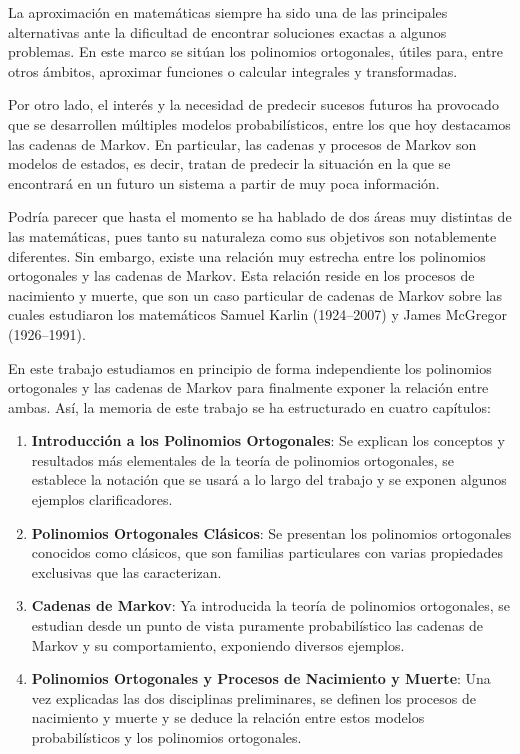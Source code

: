 
La aproximación en matemáticas siempre ha sido una de las principales alternativas ante la dificultad de encontrar soluciones exactas a algunos problemas. En este marco se sitúan los polinomios ortogonales, útiles para, entre otros ámbitos, aproximar funciones o calcular integrales y transformadas. 

Por otro lado, el interés y la necesidad de predecir sucesos futuros ha provocado que se desarrollen múltiples modelos probabilísticos, entre los que hoy destacamos las cadenas de Markov. En particular, las cadenas y procesos de Markov son modelos de estados, es decir, tratan de predecir la situación en la que se encontrará en un futuro un sistema a partir de muy poca información. 

Podría parecer que hasta el momento se ha hablado de dos áreas muy distintas de las matemáticas, pues tanto su naturaleza como sus objetivos son notablemente diferentes. Sin embargo, existe una relación muy estrecha entre los polinomios ortogonales y las cadenas de Markov. Esta relación reside en los procesos de nacimiento y muerte, que son un caso particular de cadenas de Markov sobre las cuales estudiaron los matemáticos Samuel Karlin (1924--2007) y James McGregor (1926--1991).

En este trabajo estudiamos en principio de forma independiente los polinomios ortogonales y las cadenas de Markov para finalmente exponer la relación entre ambas. Así, la memoria de este trabajo se ha estructurado en cuatro capítulos:

\begin{enumerate}
    \item \textbf{Introducción a los Polinomios Ortogonales}: Se explican los conceptos y resultados más elementales de la teoría de polinomios ortogonales, se establece la notación que se usará a lo largo del trabajo y se exponen algunos ejemplos clarificadores.
    \item \textbf{Polinomios Ortogonales Clásicos}: Se presentan los polinomios ortogonales conocidos como clásicos, que son familias particulares con varias propiedades exclusivas que las caracterizan.
    \item \textbf{Cadenas de Markov}: Ya introducida la teoría de polinomios ortogonales, se estudian desde un punto de vista puramente probabilístico las cadenas de Markov y su comportamiento, exponiendo diversos ejemplos.
    \item \textbf{Polinomios Ortogonales y Procesos de Nacimiento y Muerte}: Una vez explicadas las dos disciplinas preliminares, se definen los procesos de nacimiento y muerte y se deduce la relación entre estos modelos probabilísticos y los polinomios ortogonales.
\end{enumerate}

